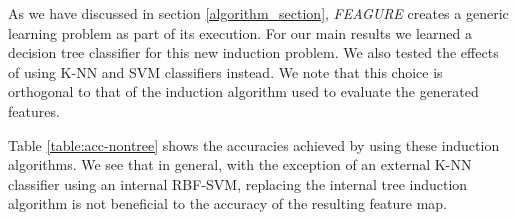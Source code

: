 \documentclass[twoside,11pt]{article}
\theoremstyle{definition}
\begin{document}

As we have discussed in section \ref{algorithm_section}, \emph{FEAGURE} creates a generic learning problem as part of its execution. For our main results we learned a decision tree classifier for this new induction problem.
We also tested the effects of using K-NN and SVM classifiers instead. %
We note that this choice is orthogonal to that of the induction algorithm used to evaluate the generated features.

Table \ref{table:acc-nontree} shows the accuracies achieved by using these induction algorithms. We see that in general, with the exception of an external K-NN classifier using an internal RBF-SVM, replacing the internal tree induction algorithm is not beneficial to the accuracy of the resulting feature map.
\end{document}
